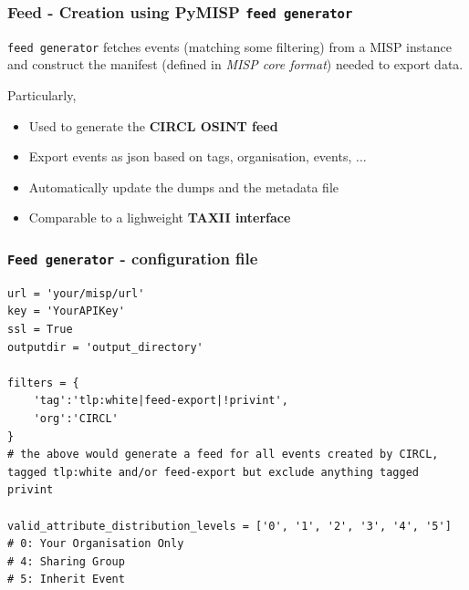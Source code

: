 \begin{frame}
    \frametitle{Feed - Creation using PyMISP \texttt{feed generator}}
    \texttt{feed generator} fetches events (matching some filtering) from a MISP instance and construct the manifest (defined in \textit{MISP core format}) needed to export data.

    \vspace{15px}
    Particularly,
    \begin{itemize}
        \item Used to generate the {\bf CIRCL OSINT feed}
        \item Export events as json based on tags, organisation, events, ...
        \item Automatically update the dumps and the metadata file
        \item Comparable to a lighweight {\bf TAXII interface}
    \end{itemize}
\end{frame}

\begin{frame}[fragile]
    \frametitle{\texttt{Feed generator} - configuration file}
    \begin{lstlisting}
url = 'your/misp/url'
key = 'YourAPIKey'
ssl = True
outputdir = 'output_directory'

filters = {
    'tag':'tlp:white|feed-export|!privint',
    'org':'CIRCL'
}
# the above would generate a feed for all events created by CIRCL, tagged tlp:white and/or feed-export but exclude anything tagged privint

valid_attribute_distribution_levels = ['0', '1', '2', '3', '4', '5']
# 0: Your Organisation Only
# 4: Sharing Group
# 5: Inherit Event
    \end{lstlisting}
\end{frame}

